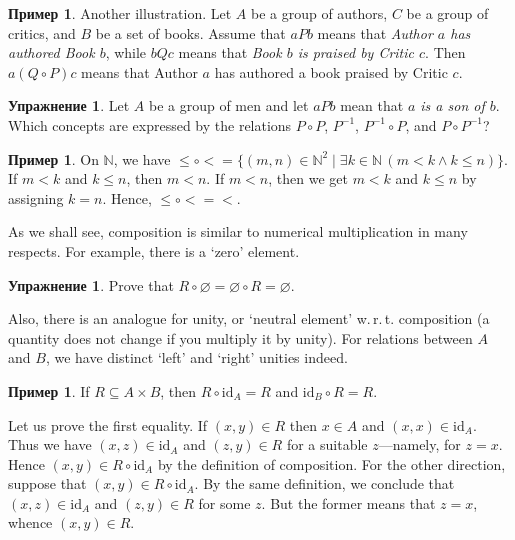\documentclass[12pt,notitlepage]{article}
\theoremstyle{plain}
\theoremstyle{definition}
\newtheorem{exc}[thm]{Упражнение}
\newtheorem{exm}[thm]{Пример}
\theoremstyle{plain}
\newcommand{\N}{\mathbb{N}}
\newcommand{\sbs}{\subseteq}
\newcommand{\void}{\varnothing}
\newcommand{\id}{\mathrm{id}}
\newcommand{\1}{\mathbf{1}}
\newcommand{\0}{\mathbf{0}}
\begin{document}
\begin{exm} Another illustration. Let $A$ be a group of authors, $C$ be a group of critics, and $B$ be a set of books. Assume that $a P b$ means that \emph{Author $a$ has authored Book $b$}, while  $b Q c$ means that \emph{Book $b$ is praised by Critic $c$}. Then  $a (Q \circ P) c$ means that Author $a$ has authored a book praised by Critic $c$.
\end{exm}

\begin{exc}
	Let $A$ be a group of men and let $a P b$ mean that \emph{$a$ is a son of $b$}. Which concepts are expressed by the relations $P\circ P$, $P^{-1}$, $P^{-1} \circ P$, and $P \circ P^{-1}$?
\end{exc}

\begin{exm}
	On $\N$, we have ${\leq}\circ{<} = \{(m,  n) \in \N^2 \mid \exists k\in \N\, (m < k \wedge k \leq n)\}$. If $m < k$ and $k \leq n$, then $m < n$. If $m < n$, then we get $m < k$ and $k \leq n$ by assigning $k = n$. Hence, ${\leq}\circ{<} = {<}$.
\end{exm}

As we shall see, composition is similar to numerical multiplication in many respects. For example, there is a `zero' element.
\begin{exc}
	Prove that $R \circ \void = \void \circ R = \void$.
\end{exc}

Also, there is an analogue for unity, or `neutral element' w.\,r.\,t. composition (a quantity does not change if you multiply it by unity). For relations between $A$ and $B$, we have  distinct `left' and `right' unities indeed.
\begin{exm}
	If $R \sbs A \times B$, then $R \circ \id_A = R$ and $\id_B \circ R = R$.
	
	Let us prove the first equality. If $(x,y) \in R$ then $x \in A$ and $(x,x) \in \id_A$. Thus we have $(x,z) \in \id_A$ and $(z,y) \in R$ for a suitable $z$---namely, for $z = x$. Hence $(x,y) \in R \circ \id_A$ by the definition of composition. For the other direction, suppose that $(x,y) \in R \circ \id_A$. By the same definition, we conclude that $(x,z) \in \id_A$ and $(z,y) \in R$ for some $z$. But the former means that $z = x$, whence $(x,y) \in R$.
\end{exm}
\end{document}
